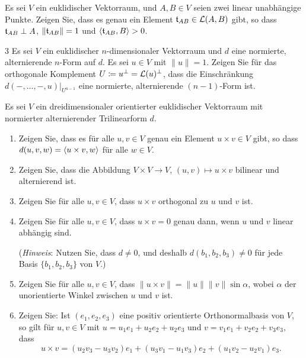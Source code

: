 \begin{question}[subtitle = Zur Existenz von Tangentialvektoren]{2}
  Es sei $V$ ein euklidischer Vektorraum, und $A, B \in V$ seien zwei linear unabhängige Punkte.
  Zeigen Sie, dass es genau ein Element $\mathfrak{t}_{AB} \in \operatorname{\mathcal{L}}(A,B)$ gibt, so dass $\mathfrak{t}_{AB} \perp A$, $\|\mathfrak{t}_{AB}\| = 1$ und $\left\langle \mathfrak{t}_{AB}, B \right\rangle > 0$.
\end{question}







\begin{question}[subtitle = Einschränkung der Orientierung auf das orthogonale Komplement]{3}
  Es sei $V$ ein euklidischer $n$-dimensionaler Vektorraum und $d$ eine normierte, alternierende $n$-Form auf $d$.
  Es sei $u \in V$ mit $\|u\| = 1$.
  Zeigen Sie für das orthogonale Komplement $U \coloneqq u^\perp = \operatorname{\mathcal{L}}(u)^\perp$, dass die Einschränkung $d(-, \dotsc, -, u)|_{U^{n-1}}$ eine normierte, alternierende $(n-1)$-Form ist.
\end{question}


\begin{question}[subtitle = Konstruktion und Eigenschaften des Kreuzprodukts]{3}
  Es sei $V$ ein dreidimensionaler orientierter euklidischer Vektorraum mit normierter alternierender Trilinearform $d$.
  \begin{enumerate}[leftmargin=*]
    \item
      Zeigen Sie, dass es für alle $u, v \in V$ genau ein Element $u \times v \in V$ gibt, so dass $d(u,v,w) = \left\langle u \times v, w \right\rangle$ für alle $w \in V$.
    \item
      Zeigen Sie, dass die Abbildung $V \times V \to V$, $(u,v) \mapsto u \times v$ bilinear und alternierend ist.
    \item
      Zeigen Sie für alle $u, v \in V$, dass $u \times v$ orthogonal zu $u$ und $v$ ist.
    \item
      Zeigen Sie für alle $u, v \in V$, dass $u \times v = 0$ genau dann, wenn $u$ und $v$ linear abhängig sind.
      
      (\emph{Hinweis}:
       Nutzen Sie, dass $d \neq 0$, und deshalb $d(b_1, b_2, b_3) \neq 0$ für jede Basis $\{b_1, b_2, b_3\}$ von $V$.)
    \item
      Zeigen Sie für alle $u, v \in V$, dass $\|u \times v\| = \|u\| \|v\| \sin \alpha$, wobei $\alpha$ der unorientierte Winkel zwischen $u$ und $v$ ist.
    \item
      Zeigen Sie:
      Ist $(e_1, e_2, e_3)$ eine positiv orientierte Orthonormalbasis von $V$, so gilt für $u, v \in V$ mit $u = u_1 e_1 + u_2 e_2 + u_2 e_3$ und $v = v_1 e_1 + v_2 e_2 + v_3 e_3$, dass
      \[
        u \times v = (u_2 v_3 - u_3 v_2) e_1 + (u_3 v_1 - u_1 v_3) e_2 + (u_1 v_2 - u_2 v_1) e_3.
      \]
  \end{enumerate}
\end{question}





